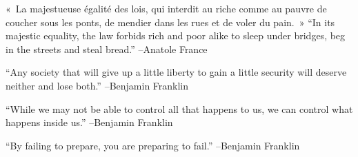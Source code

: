 \documentclass{article}%
\begin{document}
\linebreak%
\vspace{1mm}%
\begin{minipage}{\textwidth}%
\flushleft%
«~La majestueuse égalité des lois, qui interdit au riche comme au pauvre de coucher sous les ponts, de mendier dans les rues et de voler du pain.~»%
\linebreak%
\vspace{1mm}%
“In its majestic equality, the law forbids rich and poor alike to sleep under bridges, beg in the streets and steal bread.”%
\linebreak%
–Anatole France%
\linebreak%
\vspace{1mm}%
\end{minipage}%
\linebreak%
\vspace{1mm}%
\begin{minipage}{\textwidth}%
\flushleft%
“Any society that will give up a little liberty to gain a little security will deserve neither and lose both.”%
\linebreak%
\vspace{1mm}%
–Benjamin Franklin%
\linebreak%
\vspace{1mm}%
\end{minipage}%
\linebreak%
\vspace{1mm}%
\begin{minipage}{\textwidth}%
\flushleft%
“While we may not be able to control all that happens to us, we can control what happens inside us.”%
\linebreak%
\vspace{1mm}%
–Benjamin Franklin%
\linebreak%
\vspace{1mm}%
\end{minipage}%
\linebreak%
\vspace{1mm}%
\begin{minipage}{\textwidth}%
\flushleft%
“By failing to prepare, you are preparing to fail.”%
\linebreak%
\vspace{1mm}%
–Benjamin Franklin%
\linebreak%
\vspace{1mm}%
\end{minipage}%
\linebreak%
\vspace{1mm}%
\end{document}
